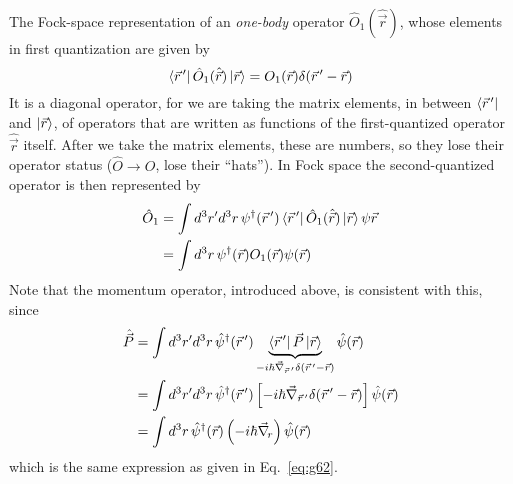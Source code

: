 \documentclass[12pt]{article}
\newcommand{\be}{\begin{equation}}
\newcommand{\ee}{\end{equation}}
\newcommand{\vecrp}{\ensuremath{\vec{r}^{\,\prime}}}
\newcommand{\vecnr}{\ensuremath{\vec{\nabla}_{\!r}}}
\begin{document}
The Fock-space representation of an \emph{one-body} operator
$\hat{O}_1(\hat{\vec{r}})$, whose elements in first quantization
are given by
\be
\bra{\vecrp}\hat{O}_1(\hat{\vec{r}})\ket{\vec{r}} = 
O_1(\vec{r}) \delta(\vecrp-\vec{r})
\ee
It is a diagonal operator, for we are taking the matrix elements, 
in between $\bra{\vecrp}$ and $\ket{\vec{r}}$,
of operators that are written as functions of the first-quantized operator $\hat{\vec{r}}$ itself.
After we take the matrix elements, these are numbers,
so they lose their operator status ($\hat{O} \to O$, lose their ``hats'').
In Fock space the second-quantized operator is then represented by
\be
\begin{aligned}
\hat{O}_1
&=\int d^3r^\prime d^3r\, \psi^\dagger(\vecrp)
\bra{\vecrp}\hat{O}_1(\hat{\vec{r}})\ket{\vec{r}}\psi{\vec{r}}\\
&=\int d^3r\, \psi^\dagger(\vec{r}) O_1(\vec{r}) \psi(\vec{r})
\end{aligned}
\ee
Note that  the momentum operator, introduced
above, is consistent with this, since
\[
\begin{aligned}
\hat{\vec{P}} 
&= \int d^3r^\prime d^3r\, 
\hat{\psi}^\dagger(\vecrp) \underbrace{\bra{\vecrp}\vec{P}\ket{\vec{r}}}%
_{-i\hbar\vec{\nabla}_{\vec{r}^{\,\prime}}\delta(\vecrp-\vec{r})}
\hat{\psi}(\vec{r})\\
&= \int d^3r^\prime d^3r\,
\hat{\psi}^\dagger(\vecrp)
\left[-i\hbar\vec{\nabla}_{\vec{r}^{\,\prime}}\delta(\vecrp-\vec{r})\right]
\hat{\psi}(\vec{r})\\
&= \int d^3r\,
\hat{\psi}^\dagger(\vec{r})\left(-i\hbar\vecnr\right)\hat{\psi}(\vec{r})
\end{aligned}
\]
which is the same expression as given in Eq.~\eqref{eq:g62}.

\end{document}
